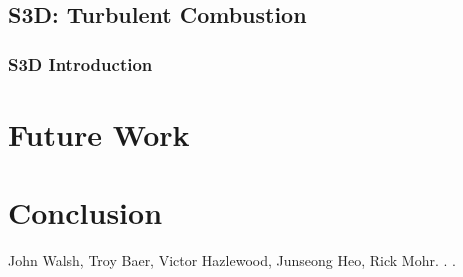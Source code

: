 \documentclass[10pt, conference, compsocconf]{IEEEtran}
\begin{document}
\subsection{S3D: Turbulent Combustion}

\subsubsection{S3D Introduction}



\section{Future Work}

\section{Conclusion}





%
%
%
\begin{thebibliography}{1}

John Walsh, Troy Baer, Victor Hazlewood, Junseong Heo, Rick Mohr.
.
.
\end{thebibliography}


\end{document}
